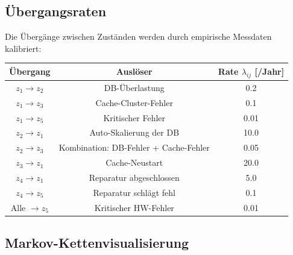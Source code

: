 \documentclass[a4paper,11pt]{article}
\theoremstyle{definition}
\begin{document}
\subsection{Übergangsraten}

Die Übergänge zwischen Zuständen werden durch empirische Messdaten kalibriert:

\begin{table}[H]
    \centering
    \begin{tabular}{|c|c|c|}
        \hline
        \textbf{Übergang} & \textbf{Auslöser} & \textbf{Rate $\lambda_{ij}$ [/Jahr]} \\
        \hline
        $z_1 \to z_2$ & DB-Überlastung & 0.2 \\
        $z_1 \to z_3$ & Cache-Cluster-Fehler & 0.1 \\
        $z_1 \to z_5$ & Kritischer Fehler & 0.01 \\
        $z_2 \to z_1$ & Auto-Skalierung der DB & 10.0 \\
        $z_2 \to z_3$ & Kombination: DB-Fehler + Cache-Fehler & 0.05 \\
        $z_3 \to z_1$ & Cache-Neustart & 20.0 \\
        $z_4 \to z_1$ & Reparatur abgeschlossen & 5.0 \\
        $z_4 \to z_5$ & Reparatur schlägt fehl & 0.1 \\
        Alle $\to z_5$ & Kritischer HW-Fehler & 0.01 \\
        \hline
    \end{tabular}
\end{table}

\subsection{Markov-Kettenvisualisierung}
\end{document}
